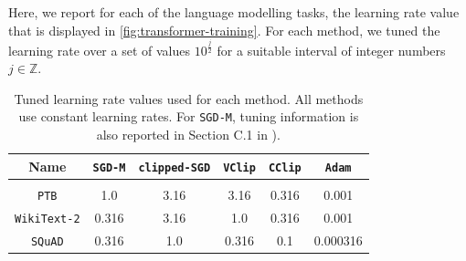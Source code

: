 \documentclass[10pt]{article} %
\newcommand{\SGDM}{\texttt{SGD-M}}
\newcommand{\VC}{\texttt{VClip}}
\newcommand{\CC}{\texttt{CClip}}
\begin{document}
Here, we report for each of the language modelling tasks, the learning rate value that is displayed in \cref{fig:transformer-training}.
For each method, we tuned the learning rate over a set of values $10^{\frac{j}{2}}$ for a suitable interval of integer numbers $j \in \mathbb{Z}$.

\begin{table}[h]
    \caption{Tuned learning rate values used for each method. All methods use constant learning rates. For \SGDM{}, tuning information is also reported in Section C.1 in \citep{kunstner2023noise}).}
    \vspace{0.5cm}
    \centering
    \begin{tabular}{c|ccccc}
         Name&  \SGDM{} & \texttt{clipped-SGD} & \VC{} & \CC{} & \texttt{Adam} \\
         \hline \\
         \texttt{PTB} & 1.0 & 3.16 & 3.16 & 0.316 & 0.001 \\
         \texttt{WikiText-2}& 0.316 & 3.16 & 1.0 & 0.316 & 0.001 \\
         \texttt{SQuAD}& 0.316 & 1.0 & 0.316 & 0.1 & 0.000316\\
    \end{tabular}
    \label{tab:transformer-lr-values}
\end{table}

\end{document}
